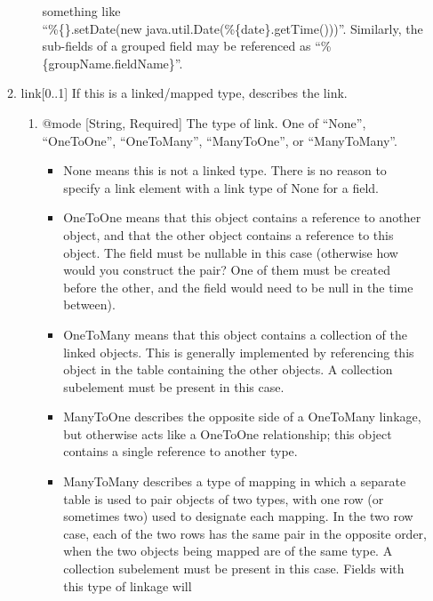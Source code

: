 \documentclass{book}
\begin{document}
\begin{enumerate}
\begin{enumerate}
\begin{enumerate}
                  something like\\
                  ``\%\{\}.setDate(new java.util.Date(\%\{date\}.getTime()))''.
                  Similarly, the sub-fields of a grouped field may be referenced
                  as ``\%\{groupName.fieldName\}''.
        \end{enumerate}
        \item link[0..1] If this is a linked/mapped type, describes the link.
        \begin{enumerate}
            \item @mode [String, Required] The type of link. One of ``None'',
                  ``OneToOne'', ``OneToMany'', ``ManyToOne'', or ``ManyToMany''.
            \begin{itemize}
                \item None means this is not a linked type. There is no
                reason to specify a link element with a link type of None
                for a field.
                \item OneToOne means that this object contains a reference
                to another object, and that the other object contains a
                reference to this object. The field must be nullable in
                this case (otherwise how would you construct the pair? One
                of them must be created before the other, and the field
                would need to be null in the time between).
                \item OneToMany means that this object contains a
                collection of the linked objects. This is generally
                implemented by referencing this object in the table
                containing the other objects. A collection subelement
                must be present in this case.
                \item ManyToOne describes the opposite side of a OneToMany
                linkage, but otherwise acts like a OneToOne relationship;
                this object contains a single reference to another type.
                \item ManyToMany describes a type of mapping in which a
                separate table is used to pair objects of two types,
                with one row (or sometimes two) used to designate each
                mapping. In the two row case, each of the two rows has
                the same pair in the opposite order, when the two objects
                being mapped are of the same type. A collection subelement must
                be present in this case. Fields with this type of linkage will

\end{itemize}
\end{enumerate}
\end{enumerate}
\end{enumerate}
\end{document}
